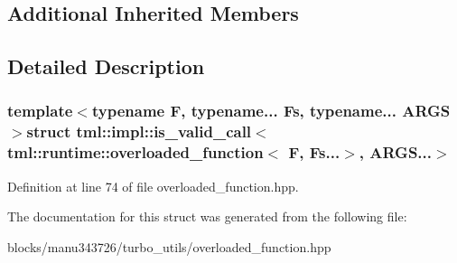\subsection*{Additional Inherited Members}


\subsection{Detailed Description}
\subsubsection*{template$<$typename F, typename... Fs, typename... A\+R\+G\+S$>$struct tml\+::impl\+::is\+\_\+valid\+\_\+call$<$ tml\+::runtime\+::overloaded\+\_\+function$<$ F, Fs...$>$, A\+R\+G\+S...$>$}



Definition at line 74 of file overloaded\+\_\+function.\+hpp.



The documentation for this struct was generated from the following file\+:\begin{DoxyCompactItemize}
\item 
blocks/manu343726/turbo\+\_\+utils/overloaded\+\_\+function.\+hpp\end{DoxyCompactItemize}
